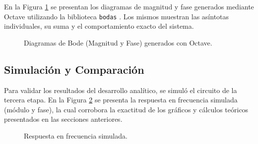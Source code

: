 En la Figura \ref{fig:ej3_bode_octave} se presentan los diagramas de magnitud y fase generados mediante Octave utilizando la biblioteca \texttt{bodas} \cite{bodas}. Los mismos muestran las asíntotas individuales, su suma y el comportamiento exacto del sistema.

\begin{figure}[!ht]
    \centering
    \begin{subfigure}[t]{\textwidth}
        \centering
        \resizebox{\textwidth}{!}{%
        }
    \end{subfigure}
    
    \vspace{-0.5cm}
    
    \begin{subfigure}[t]{\textwidth}
        \centering
        \resizebox{\textwidth}{!}{%
        }
    \end{subfigure}
    \caption{Diagramas de Bode (Magnitud y Fase) generados con Octave.}
    \label{fig:ej3_bode_octave}
\end{figure}

\subsection{Simulación y Comparación}

Para validar los resultados del desarrollo analítico, se simuló el circuito de la tercera etapa. En la Figura \ref{fig:ej3_simulacion_kicad} se presenta la respuesta en frecuencia simulada (módulo y fase), la cual corrobora la exactitud de los gráficos y cálculos teóricos presentados en las secciones anteriores.

\begin{figure}[!ht]
    \centering
    
    \caption{Respuesta en frecuencia simulada.}
    \label{fig:ej3_simulacion_kicad}
\end{figure}
